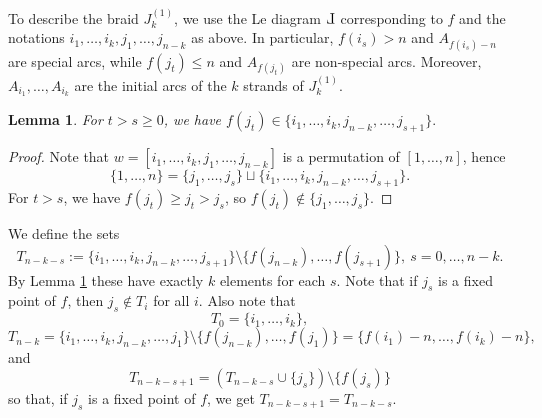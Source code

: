 \documentclass[10pt]{amsart}
\theoremstyle{plain}
\newtheorem{lemma}[thm]{Lemma}
\theoremstyle{definition}
\theoremstyle{remark}
\numberwithin{equation}{section}
\newcommand{\JS}[1]{{\color{cyan}{{\bf Jos\'e}: #1}}}
\def\Le{\reflectbox{$\mathrm{L}$}}
\begin{document}
To describe the braid $J_k^{(1)}$, we use the Le diagram $\Le$ corresponding to $f$ and the notations $i_1,\ldots,i_k, j_1,\ldots,j_{n-k}$ as above. In particular, $f(i_s)>n$ and $A_{f(i_s)-n}$ are special arcs, while $f(j_t)\le n$ and $A_{f(j_t)}$ are non-special arcs. Moreover, $A_{i_1}, \dots, A_{i_k}$ are the initial arcs of the $k$ strands of $J_{k}^{(1)}$. 

\begin{lemma}
\label{lem: right end}
For $t>s \geq 0$, we have $f(j_t)\in \{i_1, \dots, i_k, j_{n-k}, \dots, j_{s+1}\}.$
\end{lemma}

\begin{proof}
Note that $w=[i_1,\ldots,i_k,j_{1},\ldots,j_{n-k}]$ is a permutation of $[1,\ldots,n]$, hence 
$$
\{1,\ldots,n\}=\{j_1,\ldots,j_s\}\sqcup \{i_1, \dots, i_k, j_{n-k}, \dots, j_{s+1}\}.
$$ 
For $t>s$, we have $f(j_t)\ge j_t>j_s$, so 
$f(j_t)\notin \{j_1,\ldots,j_s\}$.
\end{proof}

We define the sets
\begin{equation}
\label{eq: def tuple}
T_{n-k-s} := \{i_1, \dots, i_k, j_{n-k}, \dots, j_{s+1}\} \setminus \{f(j_{n-k}), \dots, f(j_{s+1})\},\ s=0,\ldots,n-k.
\end{equation}
By Lemma \ref{lem: right end} these have exactly $k$ elements for each $s$.
Note that if $j_s$ is a fixed point of $f$, then $j_s \not\in T_{i}$ for all $i$. Also note that
\[
T_{0}=\{i_1,\ldots,i_k\},
\]
\[T_{n-k} = \{i_1, \dots, i_k, j_{n-k}, \dots, j_1\}\setminus \{f(j_{n-k}), \dots, f(j_1)\} = \{f(i_1) - n, \dots, f(i_k) - n\},
\] 
and
\[
T_{n-k-s+1}=\left(T_{n-k-s}\cup\{j_s\}\right)\setminus \{f(j_s)\}
\]
so that, if $j_s$ is a fixed point of $f$, we get $T_{n-k-s+1} = T_{n-k-s}$. 

\end{document}
